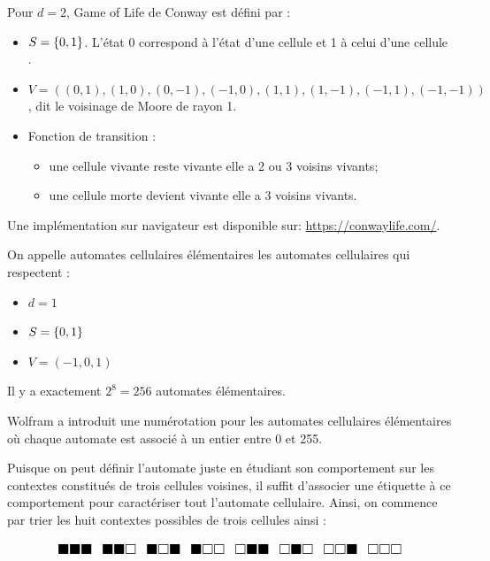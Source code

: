 \begin{exemple}
	Pour $d = 2$, Game of Life de Conway \cite{conwayGOL} est défini par :
	\begin{itemize}
		\item $S = \left\{0,1\right\}$. L'état 0 correspond à l'état d'une cellule  et 1 à celui d'une cellule .
		\item $V = ((0,1), (1,0), (0,-1), (-1,0), (1,1), (1,-1), (-1,1), (-1,-1))$, dit le voisinage de Moore de rayon 1.
		\item Fonction de transition :
		      \begin{itemize}
			      \item une cellule vivante reste vivante \ssi elle a 2 ou 3 voisins vivants;
			      \item une cellule morte devient vivante \ssi elle a 3 voisins vivants.
		      \end{itemize}
	\end{itemize}

	Une implémentation sur navigateur est disponible sur: \url{https://conwaylife.com/}.
\end{exemple}

\begin{definition}
	On appelle automates cellulaires élémentaires les automates cellulaires qui respectent :
	\begin{itemize}
		\item $d = 1$
		\item $S = \left\{0,1\right\}$
		\item $V = (-1,0,1)$
	\end{itemize}

	Il y a exactement $2^8 = 256$ automates élémentaires.
\end{definition}

Wolfram a introduit une numérotation \cite{wolfgramClass} pour les automates cellulaires élémentaires où chaque automate
est associé à un entier entre 0 et 255.

Puisque on peut définir l'automate juste en étudiant son comportement sur les contextes constitués
de trois cellules voisines, il 	suffit d'associer une
étiquette à ce comportement pour caractériser tout l'automate cellulaire. Ainsi, on commence par trier
les huit contextes possibles de trois cellules ainsi :

\[ \LARGE
	\substack{\blacksquare \blacksquare \blacksquare } \enspace
	\substack{\blacksquare \blacksquare \square } \enspace
	\substack{\blacksquare \square \blacksquare } \enspace
	\substack{\blacksquare \square \square } \enspace
	\substack{\square \blacksquare \blacksquare } \enspace
	\substack{\square \blacksquare \square } \enspace
	\substack{\square \square \blacksquare } \enspace
	\substack{\square \square \square }
\]

